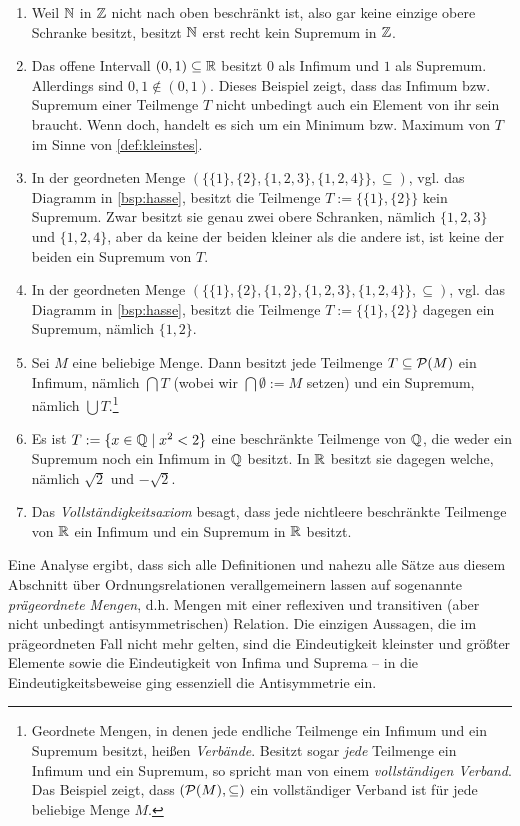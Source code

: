 \begin{bsp} \quad
    \begin{enumerate}
        \item Weil $\mathbb N$ in $\mathbb Z$ nicht nach oben beschränkt ist, also gar keine einzige obere Schranke besitzt, besitzt $\mathbb N$ erst recht kein Supremum in $\mathbb Z$.
        \item Das offene Intervall $(0,1)\subseteq \mathbb R$ besitzt $0$ als Infimum und $1$ als Supremum. Allerdings sind $0,1\notin (0,1)$. Dieses Beispiel zeigt, dass das Infimum bzw. Supremum einer Teilmenge $T$ nicht unbedingt auch ein Element von ihr sein braucht. Wenn doch, handelt es sich um ein Minimum bzw. Maximum von $T$ im Sinne von \cref{def:kleinstes}.
        \item In der geordneten Menge $(\{\{1\},\{2\},\{1,2,3\},\{1,2,4\}\},\subseteq)$, vgl. das Diagramm in \cref{bsp:hasse}, besitzt die Teilmenge $T:=\{\{1\},\{2\}\}$ kein Supremum. Zwar besitzt sie genau zwei obere Schranken, nämlich $\{1,2,3\}$ und $\{1,2,4\}$, aber da keine der beiden kleiner als die andere ist, ist keine der beiden ein Supremum von $T$.
        \item In der geordneten Menge $(\{\{1\},\{2\},\{1,2\},\{1,2,3\},\{1,2,4\}\},\subseteq)$, vgl. das Diagramm in \cref{bsp:hasse}, besitzt die Teilmenge $T:=\{\{1\},\{2\}\}$ dagegen ein Supremum, nämlich $\{1,2\}$.
        \item Sei $M$ eine beliebige Menge. Dann besitzt jede Teilmenge $T\subseteq \mathcal P(M)$ ein Infimum, nämlich $\bigcap T$ (wobei wir $\bigcap \emptyset:=M$ setzen) und ein Supremum, nämlich $\bigcup T$.\footnote{Geordnete Mengen, in denen jede endliche Teilmenge ein Infimum und ein Supremum besitzt, heißen \emph{Verbände}. Besitzt sogar \emph{jede} Teilmenge ein Infimum und ein Supremum, so spricht man von einem \emph{vollständigen Verband}. Das Beispiel zeigt, dass $(\mathcal P(M),\subseteq)$ ein vollständiger Verband ist für jede beliebige Menge $M$.}
        \item Es ist $T:=\{x\in \mathbb Q \mid x^2 < 2\}$ eine beschränkte Teilmenge von $\mathbb Q$, die weder ein Supremum noch ein Infimum in $\mathbb Q$ besitzt. In $\mathbb R$ besitzt sie dagegen welche, nämlich $\sqrt{2}$ und $-\sqrt{2}$.
        \item Das \emph{Vollständigkeitsaxiom} besagt, dass jede nichtleere beschränkte Teilmenge von $\mathbb R$ ein Infimum und ein Supremum in $\mathbb R$ besitzt.
    \end{enumerate}
\end{bsp}


\begin{bem}
    Eine Analyse ergibt, dass sich alle Definitionen und nahezu alle Sätze aus diesem Abschnitt über Ordnungsrelationen verallgemeinern lassen auf sogenannte \emph{prägeordnete Mengen}, d.h. Mengen mit einer reflexiven und transitiven (aber nicht unbedingt antisymmetrischen) Relation. Die einzigen Aussagen, die im prägeordneten Fall nicht mehr gelten, sind die Eindeutigkeit kleinster und größter Elemente sowie die Eindeutigkeit von Infima und Suprema -- in die Eindeutigkeitsbeweise ging essenziell die Antisymmetrie ein.
\end{bem}


